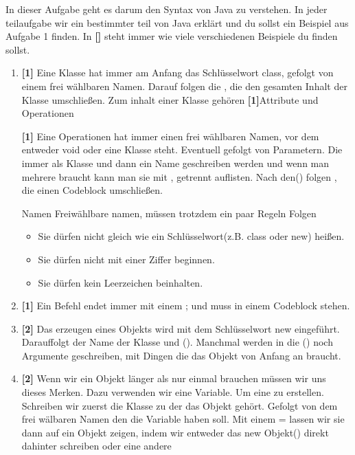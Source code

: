 
In dieser Aufgabe geht es darum den Syntax von Java zu verstehen.
In jeder teilaufgabe wir ein bestimmter teil von Java erklärt und du sollst ein Beispiel aus Aufgabe 1 finden. In \textbf{[]} steht immer wie viele verschiedenen Beispiele du finden sollst.

\renewcommand{\theenumi}{\alph{enumi}}
\begin{enumerate}
    \item \textbf{[1]} Eine Klasse hat immer am Anfang das Schlüsselwort class, gefolgt von einem frei wählbaren Namen. Darauf folgen die { }, die den gesamten Inhalt der Klasse umschließen.
    Zum inhalt einer Klasse gehören \textbf{[1]}Attribute und Operationen

    \textbf{[1]} Eine Operationen hat immer einen frei wählbaren Namen, vor dem entweder void oder eine Klasse steht. Eventuell gefolgt von Parametern. Die immer als Klasse und dann ein Name geschreiben werden und wenn man mehrere braucht kann man sie mit , getrennt auflisten.
    Nach den() folgen {}, die einen Codeblock umschließen.
    \begin{Infobox}{Namen}
        Freiwählbare namen, müssen trotzdem ein paar Regeln Folgen
        \begin{itemize}
            \item Sie dürfen nicht gleich wie ein Schlüsselwort(z.B. class oder new) heißen.
            \item Sie dürfen nicht mit einer Ziffer beginnen.
            \item Sie dürfen kein Leerzeichen beinhalten.
        \end{itemize}
    \end{Infobox}
    \item \textbf{[1]} Ein Befehl endet immer mit einem ; und muss in einem Codeblock stehen.
    \item \textbf{[2]} Das erzeugen eines Objekts wird mit dem Schlüsselwort new eingeführt. Darauffolgt der Name der Klasse und (). Manchmal werden in die () noch Argumente geschreiben, mit Dingen die das Objekt von Anfang an braucht.
    \item \textbf{[2]} Wenn wir ein Objekt länger als nur einmal brauchen müssen wir uns dieses Merken. Dazu verwenden wir eine Variable. Um eine zu erstellen. Schreiben wir zuerst die Klasse zu der das Objekt gehört. Gefolgt von dem frei wälbaren Namen den die Variable haben soll. Mit einem = lassen wir sie dann auf ein Objekt zeigen, indem wir entweder das new Objekt() direkt dahinter schreiben oder eine andere 

\end{enumerate}
